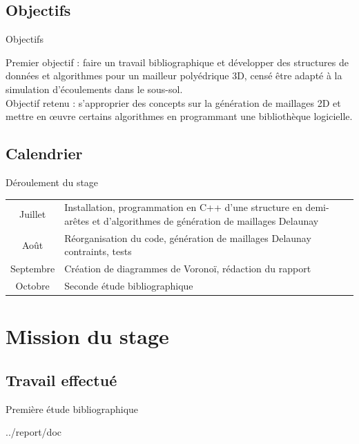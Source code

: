 \documentclass[aspectratio=169, 12pt, a4paper, hyperref={pdfauthor={Alexandre MARIN}, pdfkeywords={IFPEN, Delaunay, Voronoi, mesh generation}, colorlinks=true, linkcolor=purple, urlcolor=blue, citecolor=magenta}]{beamer}
\begin{document}
\subsection{Objectifs}
\begin{Energie}{Objectifs}

Premier objectif : faire un travail bibliographique et développer des structures de données et algorithmes pour un mailleur polyédrique 3D, censé être adapté à la simulation d'écoulements dans le sous-sol.
\\[1cm]
Objectif retenu : s'approprier des concepts sur la génération de maillages 2D et mettre en \oe{}uvre certains algorithmes en programmant une bibliothèque logicielle.
\end{Energie}

\subsection{Calendrier}
\begin{Energie}{Déroulement du stage}
{\renewcommand{\arraystretch}{1.5}
\renewcommand{\tabcolsep}{0.2cm}
\begin{tabular}{c|p{12cm}}
Juillet & Installation, programmation en C++ d'une structure en demi-arêtes et d'algorithmes de génération de maillages Delaunay\\
Août & Réorganisation du code, génération de maillages Delaunay contraints, tests\\
Septembre & Création de diagrammes de Voronoï, rédaction du rapport\\
Octobre & Seconde étude bibliographique\\
\end{tabular}}
\end{Energie}

\section{Mission du stage}

\subsection{Travail effectué}
\begin{Energie}{Première étude bibliographique}

\begin{btSect}{../report/doc}
\btPrintNotCited
\end{btSect}
\label{biblio}
\end{Energie}
\end{document}
